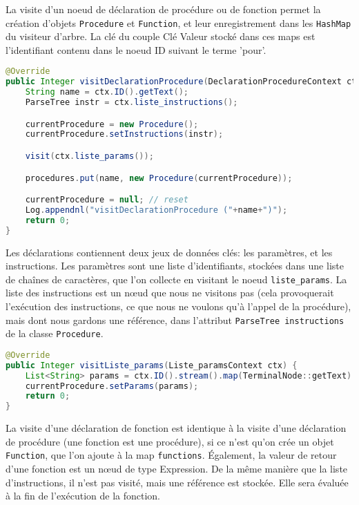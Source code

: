\documentclass[a4paper,11pt]{article}
\begin{document}
La visite d'un noeud de déclaration de procédure ou de fonction permet la création d'objets \lstinline$Procedure$ et \lstinline$Function$, et leur enregistrement dans les \lstinline$HashMap$ du visiteur d'arbre. La clé du couple Clé Valeur stocké dans ces maps est l'identifiant contenu dans le noeud ID suivant le terme 'pour'.

\begin{lstlisting}[language=Java]
@Override
public Integer visitDeclarationProcedure(DeclarationProcedureContext ctx) {
    String name = ctx.ID().getText();
    ParseTree instr = ctx.liste_instructions();

    currentProcedure = new Procedure();
    currentProcedure.setInstructions(instr);

    visit(ctx.liste_params());

    procedures.put(name, new Procedure(currentProcedure));

    currentProcedure = null; // reset
    Log.appendnl("visitDeclarationProcedure ("+name+")");
    return 0;
}
\end{lstlisting}

Les déclarations contiennent deux jeux de données clés: les paramètres, et les instructions. Les paramètres sont une liste d'identifiants, stockées dans une liste de chaînes de caractères, que l'on collecte en visitant le noeud \lstinline$liste_params$. La liste des instructions est un nœud que nous ne visitons pas (cela provoquerait l'exécution des instructions, ce que nous ne voulons qu'à l'appel de la procédure), mais dont nous gardons une référence, dans l'attribut \lstinline$ParseTree instructions$ de la classe \lstinline$Procedure$.

\begin{lstlisting}[language=Java]
@Override
public Integer visitListe_params(Liste_paramsContext ctx) {
    List<String> params = ctx.ID().stream().map(TerminalNode::getText).collect(Collectors.toList());
    currentProcedure.setParams(params);
    return 0;
}
\end{lstlisting}

La visite d'une déclaration de fonction est identique à la visite d'une déclaration de procédure (une fonction est une procédure), si ce n'est qu'on crée un objet \lstinline$Function$, que l'on ajoute à la map \lstinline$functions$. Également, la valeur de retour d'une fonction est un nœud de type Expression. De la même manière que la liste d'instructions, il n'est pas visité, mais une référence est stockée. Elle sera évaluée à la fin de l'exécution de la fonction.
\end{document}
